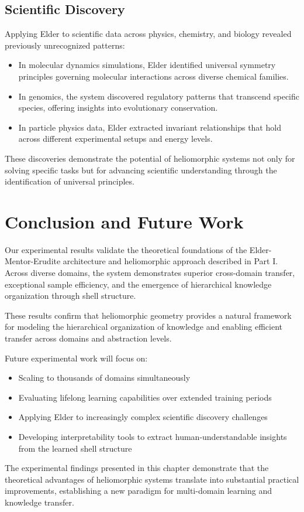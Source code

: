 \subsection{Scientific Discovery}

Applying Elder to scientific data across physics, chemistry, and biology revealed previously unrecognized patterns:

\begin{itemize}
    \item In molecular dynamics simulations, Elder identified universal symmetry principles governing molecular interactions across diverse chemical families.
    
    \item In genomics, the system discovered regulatory patterns that transcend specific species, offering insights into evolutionary conservation.
    
    \item In particle physics data, Elder extracted invariant relationships that hold across different experimental setups and energy levels.
\end{itemize}

These discoveries demonstrate the potential of heliomorphic systems not only for solving specific tasks but for advancing scientific understanding through the identification of universal principles.

\section{Conclusion and Future Work}

Our experimental results validate the theoretical foundations of the Elder-Mentor-Erudite architecture and heliomorphic approach described in Part I. Across diverse domains, the system demonstrates superior cross-domain transfer, exceptional sample efficiency, and the emergence of hierarchical knowledge organization through shell structure.

These results confirm that heliomorphic geometry provides a natural framework for modeling the hierarchical organization of knowledge and enabling efficient transfer across domains and abstraction levels.

Future experimental work will focus on:

\begin{itemize}
    \item Scaling to thousands of domains simultaneously
    \item Evaluating lifelong learning capabilities over extended training periods
    \item Applying Elder to increasingly complex scientific discovery challenges
    \item Developing interpretability tools to extract human-understandable insights from the learned shell structure
\end{itemize}

The experimental findings presented in this chapter demonstrate that the theoretical advantages of heliomorphic systems translate into substantial practical improvements, establishing a new paradigm for multi-domain learning and knowledge transfer.